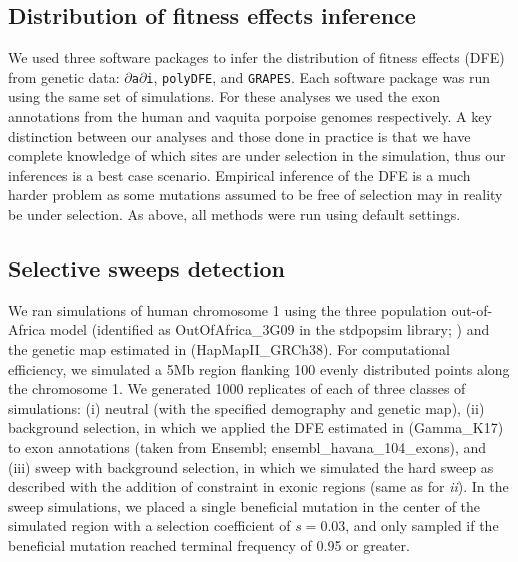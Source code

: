 \documentclass[hidelinks]{article}
\newcommand{\polydfe}{\texttt{polyDFE}\xspace}
\newcommand{\dadi}{$\partial$\texttt{a}$\partial$\texttt{i}\xspace}
\newcommand{\grapes}{\texttt{GRAPES}\xspace}
\begin{document}
    \subsection*{Distribution of fitness effects inference}
    We used three software packages to infer the distribution of fitness effects (DFE) from genetic data:
    \dadi \citep{gutenkunst2009inferring,kim2017inference}, \polydfe \citep{tataru2020polydfe}, and \grapes \citep{galtier2016adaptive}.
    Each software package was run using the same set of simulations.
    For these analyses we used the exon annotations from the human and vaquita porpoise genomes respectively.
    A key distinction between our analyses and those done in practice
    is that we have complete knowledge of which sites are under selection in the simulation,
    thus our inferences is a best case scenario. Empirical inference of the DFE is a much
    harder problem as some mutations assumed to be free of selection
    may in reality be under selection. As above, all methods were run using default settings.

    \subsection*{Selective sweeps detection}
    We ran simulations of human chromosome 1 using the three population out-of-Africa model
    (identified as OutOfAfrica\_3G09 in the stdpopsim library; \cite{gutenkunst2009inferring})
    and the genetic map estimated in \citet{international2007second} (HapMapII\_GRCh38).
    For computational efficiency, we simulated a 5Mb region flanking 100 evenly distributed points along the chromosome 1.
    We generated 1000 replicates of each of three classes of simulations:
    (i) neutral (with the specified demography and genetic map),
    (ii) background selection, in which we applied the DFE estimated in \citet{kim2017inference} (Gamma\_K17) to exon annotations (taken from Ensembl; ensembl\_havana\_104\_exons),
    and (iii) sweep with background selection, in which we simulated the hard sweep as described with the addition of constraint in exonic regions (same as for \emph{ii}).
    In the sweep simulations, we placed a single beneficial mutation in the center of the simulated region with a selection coefficient of $s = 0.03$, and only sampled if the beneficial mutation reached terminal frequency of 0.95 or greater.
\end{document}
